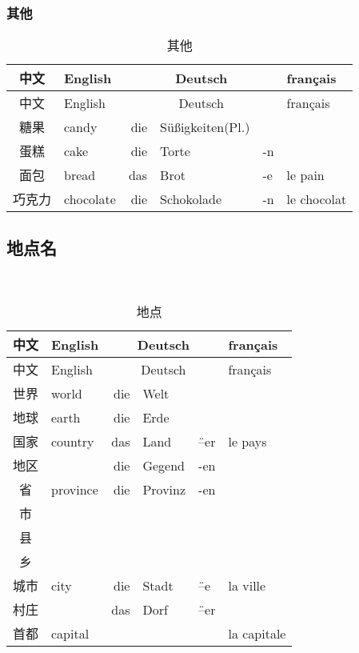 \documentclass[12pt,A4paper,oneside,reqno]{amsart}
\numberwithin{equation}{section}
\theoremstyle{plain}
\theoremstyle{plain}
\theoremstyle{plain}
\numberwithin{equation}{section}
\theoremstyle{remark}
\begin{document}
\subsubsection{其他}\hspace{1cm}
\begin{longtable}{c|l|rll|l}
	\hline
	中文	&	English	&\multicolumn{3}{c|}{Deutsch} &	français  	\\
	\hline
	\endhead
	\hline
	中文	&	English	&\multicolumn{3}{c|}{Deutsch} &	français  	\\
	\hline
	\endfirsthead	
	\hline
	\endfoot
	\hline	
	\caption{其他}
	\endlastfoot				
糖果	&	candy	&	die	&	S\"{u}\ss igkeiten(Pl.)	&		&		\\
蛋糕	&	cake	&	die	&	Torte	&	-n	&		\\
面包	&	bread	&	das 	&	Brot	&	-e	&	le pain	\\
巧克力	&	chocolate	&	die	&	Schokolade	&	-n	&	le chocolat	\\


	
\end{longtable}
\subsection{地点名}\hspace{1cm}\\
\begin{longtable}{c|l|rll|l}
	\hline
	中文	&	English	&\multicolumn{3}{c|}{Deutsch} &	français  	\\
	\hline
	\endhead
	\hline
	中文	&	English	&\multicolumn{3}{c|}{Deutsch} &	français  	\\
	\hline
	\endfirsthead	
	\hline
	\endfoot
	\hline	
	\caption{地点}
	\endlastfoot				
世界	&	world	&	die	&	Welt	&		&		\\
地球	&	earth	&	die	&	Erde	&		&		\\
国家	&	country	&	das	&	Land	&	\"{--}er	&	le pays	\\
地区	&		&	die	&	Gegend	&	-en	&		\\
省	&	province	&	die	&	Provinz	&	-en	&		\\
市	&		&		&		&		&		\\
县	&		&		&		&		&		\\
乡	&		&		&		&		&		\\
城市	&	city	&	die	&	Stadt	&	\"{--}e	&	la ville	\\
村庄	&		&	das	&	Dorf	&	\"{--}er	&		\\
首都	&	capital	&		&		&		&	la capitale	\\

	
	
	
\end{longtable}
\end{document}
